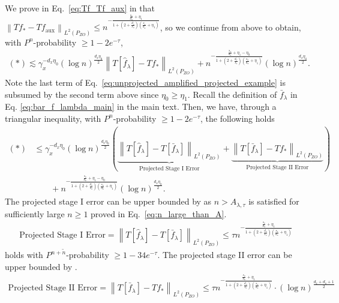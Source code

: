 \documentclass[11pt]{article}
\newcommand{\stageonesamples}{\tilde{n}}
\newcommand{\0}{\mathbf{0}}
\begin{document}
\begin{appendix}
We prove in Eq.~\eqref{eq:Tf_Tf_aux} in  that $
\left\| T f_\ast -  T f_{\mathrm{aux}} \right\|_{L^2(P_{ZO})} \leq n^{-\frac{\frac{s_x}{d_x}+\eta_1}{1+(2+\frac{d_o}{s_o})(\frac{s_x}{d_x}+\eta_1)}}$, so we continue from above to obtain, with $P^n$-probability $\geq 1 - 2e^{-\tau}$, 
\begin{align}
\label{eq:eq_to_refer_main_pf_sketch}
    (\ast) \lesssim \gamma_x^{-d_x\eta_0} (\log n)^{\frac{d_x\eta_0}{2}} \left\| T \left[\hat{f}_{\lambda}\right] -  T f_{\ast} \right\|_{L^2(P_{ZO})} + n^{-\frac{\frac{s_x}{d_x}+\eta_1 - \eta_0}{1+(2+\frac{d_o}{s_o})(\frac{s_x}{d_x}+\eta_1)}} (\log n)^{\frac{d_x\eta_0}{2}} .
\end{align}
Note the last term of Eq.~\eqref{eq:unprojected_amplified_projected_example} is subsumed by the second term above since $\eta_0 \geq \eta_1$.
Recall the definition of $\bar{f}_{\lambda}$ in Eq. \eqref{eq:bar_f_lambda_main} in the main text. Then, we have, through a triangular inequality, with $P^n$-probability $\geq 1 - 2e^{-\tau}$, the following holds
\begin{align*}
    (\ast) &\leq \gamma_x^{-d_x\eta_0} (\log n)^{\frac{d_x\eta_0}{2}} \left(\underbrace{\left\| T \left[\hat{f}_{\lambda}\right] -  T \left[\bar{f}_{\lambda}\right] \right\|_{L^2(P_{ZO})}}_{\text{Projected Stage I Error}} +  \underbrace{\left\| T \left[\bar{f}_{\lambda}\right] -  T f_{\ast} \right\|_{L^2(P_{ZO})}}_{\text{Projected Stage II Error}}\right) \\
    &\qquad + n^{-\frac{\frac{s_x}{d_x}+\eta_1 - \eta_0}{1+(2+\frac{d_o}{s_o})(\frac{s_x}{d_x}+\eta_1)}} (\log n)^{\frac{d_x\eta_0}{2}} .
\end{align*}
The projected stage I error can be upper bounded by  as $ n > A_{\lambda,\tau}$ is satisfied for sufficiently large $n \geq 1$ proved in Eq.~\eqref{eq:n_large_than_A}. 
\begin{align*}
    \text{Projected Stage I Error} = \left\| T \left[\hat{f}_{\lambda}\right] -  T \left[\bar{f}_{\lambda}\right] \right\|_{L^2(P_{ZO})} \leq \tau n^{-\frac{\frac{s_x}{d_x}+\eta_1}{1+(2+\frac{d_o}{s_o})(\frac{s_x}{d_x}+\eta_1)}}
\end{align*}
holds with $P^{n+\stageonesamples}$-probability $\geq 1-  34e^{-\tau}$.
The projected stage II error can be upper bounded by .
\begin{align*}
    \text{Projected Stage II Error} = \left\| T \left[\bar{f}_{\lambda}\right] -  T f_{\ast} \right\|_{L^2(P_{ZO})} \leq \tau n^{-\frac{\frac{s_x}{d_x}+\eta_1}{1+(2+\frac{d_o}{s_o})(\frac{s_x}{d_x}+\eta_1)}} \cdot (\log n)^{\frac{d_x+d_o+1}{2}}

\end{align*}
\end{appendix}
\end{document}
